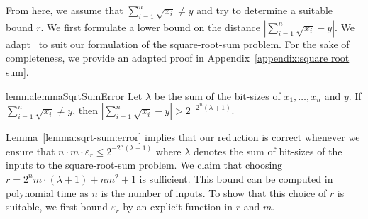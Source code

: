 \documentclass[a4paper,UKenglish,cleveref,autoref,thm-restate,colorlinks]{lipics-v2021}
\newcommand{\sqsx}{x} \newcommand{\sqsxVect}{\bar{x}} \newcommand{\sqsm}{m} \newcommand{\sqsy}{y} \newcommand{\sqsi}{i} \newcommand{\sqsn}{n} \newcommand{\sqsSize}{E}
\newcommand{\counterUB}{r}
\newcommand{\eleError}[1]{\varepsilon_{#1}}
\begin{document}
From here, we assume that $\sum_{\sqsi=1}^\sqsn\sqrt{\sqsx_\sqsi} \neq \sqsy$ and try to determine a suitable bound $\counterUB$.
We first formulate a lower bound on the distance $|\sum_{\sqsi=1}^\sqsn\sqrt{\sqsx_\sqsi} - \sqsy|$.
We adapt~\cite[Lemma~3]{DBLP:journals/jc/Tiwari92} to suit our formulation of the square-root-sum problem.
For the sake of completeness, we provide an adapted proof in Appendix~\ref{appendix:square root sum}.
\begin{restatable}{lemma}{lemmaSqrtSumError}\label{lemma:sqrt-sum:error}
  Let $\lambda$ be the sum of the bit-sizes of $\sqsx_1, \ldots, \sqsx_\sqsn$ and $\sqsy$.
  If $\sum_{\sqsi=1}^\sqsn\sqrt{\sqsx_\sqsi} \neq\sqsy$, then $|\sum_{\sqsi=1}^\sqsn\sqrt{\sqsx_\sqsi}  - \sqsy| > 2^{-2^{\sqsn}(\lambda+1)}$.
\end{restatable}

Lemma~\ref{lemma:sqrt-sum:error} implies that our reduction is correct whenever we ensure that $\sqsn\cdot\sqsm\cdot\eleError{\counterUB}\leq 2^{-2^{\sqsn}(\lambda+1)}$ where $\lambda$ denotes the sum of bit-sizes of the inputs to the square-root-sum problem.
We claim that choosing $\counterUB = 2^\sqsn\sqsm\cdot(\lambda+1)+\sqsn\sqsm^2+1$ is sufficient.
This bound can be computed in polynomial time as $\sqsn$ is the number of inputs.
To show that this choice of $\counterUB$ is suitable, we first bound $\eleError{\counterUB}$ by an explicit function in $\counterUB$ and $\sqsm$.
\end{document}
